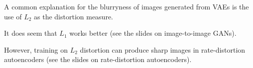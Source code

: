 {

A common explanation for the blurryness of images generated from VAEs is the use of $L_2$ as the distortion measure.

\vfill
It does seem that $L_1$ works better (see the slides on image-to-image GANs).

\vfill
However, training on $L_2$ distortion can produce sharp images in rate-distortion autoencoders (see the slides on rate-distortion autoencoders).

}


